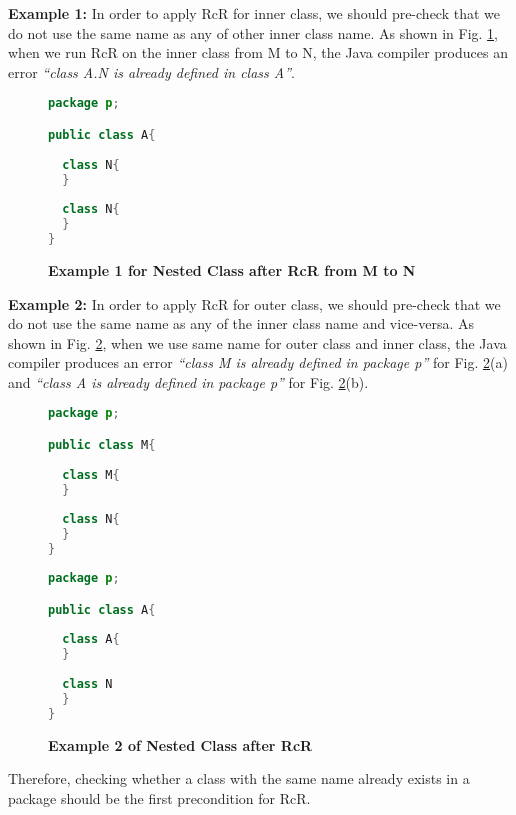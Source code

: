 \textbf{Example 1:} In order to apply RcR for inner class, we should pre-check that we do not use the same name as any of other inner class name. As shown in Fig. \ref{figure:nestedclass1}, when we run RcR on the inner class from M to N, the Java compiler produces an error \textit{``class A.N is already defined in class A''}. 

\begin{figure}[th]
\centering
\begin{minipage}[t]{0.5\linewidth}
\begin{lstlisting}[language=java, basicstyle=\scriptsize\ttfamily,frame=single]
package p;

public class A{	
    
  class N{
  }
    
  class N{
  }
} 
\end{lstlisting}
\end{minipage}
\caption{\textbf{Example 1 for Nested Class after RcR from M to N}}
\label{figure:nestedclass1}
\end{figure}


\textbf{Example 2:} In order to apply RcR for outer class, we should pre-check that we do not use the same name as any of the inner class name and vice-versa. 
As shown in Fig. \ref{figure:nestedclass2}, when we use same name for outer class and inner class, the Java compiler produces an error \textit{``class M is already defined in package p''} for Fig. \ref{figure:nestedclass2}(a) and \textit{``class A is already defined in package p''} for Fig. \ref{figure:nestedclass2}(b).

\begin{figure}[th]
\centering
\begin{minipage}[t]{0.45\linewidth}
\begin{lstlisting}[language=java, basicstyle=\scriptsize\ttfamily,frame=single]
package p;

public class M{	
  
  class M{
  }
	
  class N{
  }
} 
\end{lstlisting}
\end{minipage}
\hfill
\begin{minipage}[t]{0.45\linewidth}
\begin{lstlisting}[language=java, basicstyle=\scriptsize\ttfamily,frame=single]
package p;

public class A{	
    
  class A{
  }
    
  class N	
  }
} 
\end{lstlisting}
\end{minipage}
\caption{\textbf{Example 2 of Nested Class after RcR}}
\label{figure:nestedclass2}
\end{figure}

Therefore, checking whether a class with the same name already exists in a package should be the first precondition for RcR. 
   
